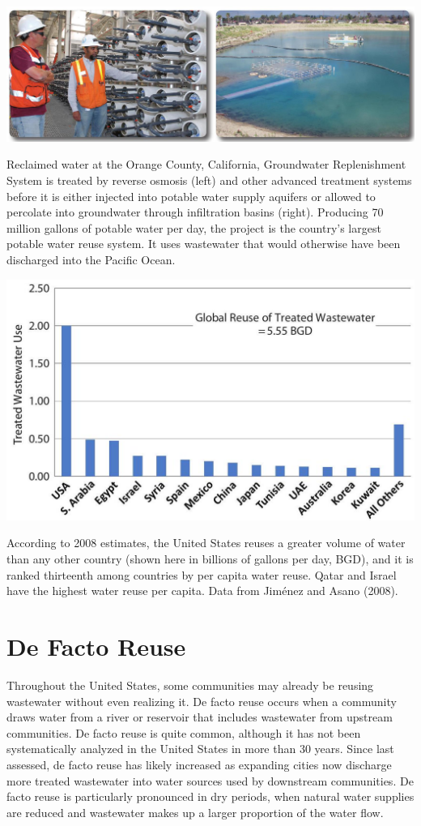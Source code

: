 \documentclass[10pt]{article}
\begin{document}
\includegraphics[max width=\textwidth]{2022_11_05_93277ca2de7ec5580550g-03}

Reclaimed water at the Orange County, California, Groundwater Replenishment System is treated by reverse osmosis (left) and other advanced treatment systems before it is either injected into potable water supply aquifers or allowed to percolate into groundwater through infiltration basins (right). Producing 70 million gallons of potable water per day, the project is the country's largest potable water reuse system. It uses wastewater that would otherwise have been discharged into the Pacific Ocean.

\includegraphics[max width=\textwidth]{2022_11_05_93277ca2de7ec5580550g-03(1)}

According to 2008 estimates, the United States reuses a greater volume of water than any other country (shown here in billions of gallons per day, BGD), and it is ranked thirteenth among countries by per capita water reuse. Qatar and Israel have the highest water reuse per capita. Data from Jiménez and Asano (2008).

\section{De Facto Reuse}
Throughout the United States, some communities may already be reusing wastewater without even realizing it. De facto reuse occurs when a community draws water from a river or reservoir that includes wastewater from upstream communities. De facto reuse is quite common, although it has not been systematically analyzed in the United States in more than 30 years. Since last assessed, de facto reuse has likely increased as expanding cities now discharge more treated wastewater into water sources used by downstream communities. De facto reuse is particularly pronounced in dry periods, when natural water supplies are reduced and wastewater makes up a larger proportion of the water flow.
\end{document}
